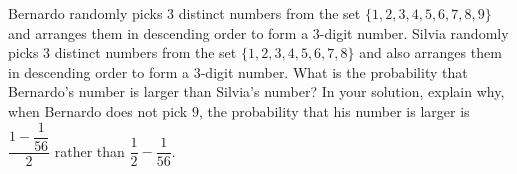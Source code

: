 Bernardo randomly picks $3$ distinct numbers from the set $\{1,2,3,4,5,6,7,8,9\}$ and arranges them in descending order to form a $3$-digit number. Silvia randomly picks $3$ distinct numbers from the set $\{1,2,3,4,5,6,7,8\}$ and also arranges them in descending order to form a $3$-digit number. What is the probability that Bernardo's number is larger than Silvia's number? In your solution, explain why, when Bernardo does not pick $9$, the probability that his number is larger is $\dfrac{1-\dfrac{1}{56}}{2}$ rather than $\dfrac{1}{2}-\dfrac{1}{56}$.
